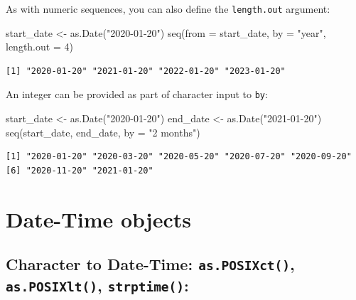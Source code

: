\documentclass[
]{book}
\newenvironment{Shaded}{\begin{snugshade}}{\end{snugshade}}
\newcommand{\AttributeTok}[1]{\textcolor[rgb]{0.77,0.63,0.00}{#1}}
\newcommand{\DecValTok}[1]{\textcolor[rgb]{0.00,0.00,0.81}{#1}}
\newcommand{\FunctionTok}[1]{\textcolor[rgb]{0.00,0.00,0.00}{#1}}
\newcommand{\NormalTok}[1]{#1}
\newcommand{\OtherTok}[1]{\textcolor[rgb]{0.56,0.35,0.01}{#1}}
\newcommand{\StringTok}[1]{\textcolor[rgb]{0.31,0.60,0.02}{#1}}
\begin{document}
As with numeric sequences, you can also define the \texttt{length.out} argument:

\begin{Shaded}
\begin{Highlighting}[]
\NormalTok{start\_date }\OtherTok{\textless{}{-}} \FunctionTok{as.Date}\NormalTok{(}\StringTok{"2020{-}01{-}20"}\NormalTok{)}
\FunctionTok{seq}\NormalTok{(}\AttributeTok{from =}\NormalTok{ start\_date, }\AttributeTok{by =} \StringTok{"year"}\NormalTok{, }\AttributeTok{length.out =} \DecValTok{4}\NormalTok{)}
\end{Highlighting}
\end{Shaded}

\begin{verbatim}
[1] "2020-01-20" "2021-01-20" "2022-01-20" "2023-01-20"
\end{verbatim}

An integer can be provided as part of character input to \texttt{by}:

\begin{Shaded}
\begin{Highlighting}[]
\NormalTok{start\_date }\OtherTok{\textless{}{-}} \FunctionTok{as.Date}\NormalTok{(}\StringTok{"2020{-}01{-}20"}\NormalTok{)}
\NormalTok{end\_date }\OtherTok{\textless{}{-}} \FunctionTok{as.Date}\NormalTok{(}\StringTok{"2021{-}01{-}20"}\NormalTok{)}
\FunctionTok{seq}\NormalTok{(start\_date, end\_date, }\AttributeTok{by =} \StringTok{"2 months"}\NormalTok{)}
\end{Highlighting}
\end{Shaded}

\begin{verbatim}
[1] "2020-01-20" "2020-03-20" "2020-05-20" "2020-07-20" "2020-09-20"
[6] "2020-11-20" "2021-01-20"
\end{verbatim}

\hypertarget{date-time-objects}{%
\section{Date-Time objects}\label{date-time-objects}}

\hypertarget{character-to-date-time-as.posixct-as.posixlt-strptime}{%
\subsection{\texorpdfstring{Character to Date-Time: \texttt{as.POSIXct()}, \texttt{as.POSIXlt()}, \texttt{strptime()}:}{Character to Date-Time: as.POSIXct(), as.POSIXlt(), strptime():}}\label{character-to-date-time-as.posixct-as.posixlt-strptime}}
\end{document}
